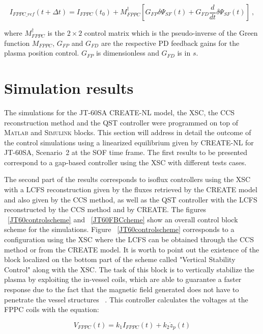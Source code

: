 \begin{equation}
I_{FPPC\_ref}(t+\Delta t)=I_{FPPC}(t_0)+ M^\dagger_{FPPC}\left[G_{FP}\delta \Psi_{SF}(t) + G_{FD}\frac{d}{dt}\delta\Psi_{SF}(t) \right] ~,
\end{equation}

where $ M^\dagger_{FPPC}$ is the $ 2 \times 2$ control matrix which is the pseudo-inverse of the Green function $M_{FPPC}$, $ G_{FP} $ and $ G_{FD} $
are the respective PD feedback gains for the plasma position control. $ G_{FP} $ is dimensionless and $ G_{FD} $ is in $s$.



\section{Simulation results}	

 The simulations for  the JT-60SA CREATE-NL model, the XSC, the CCS reconstruction method and the QST controller  were programmed on top of  \textsc{Matlab} and \textsc{Simulink} blocks. This  section will address in detail the outcome of the control simulations using a linearized equilibrium given by CREATE-NL for JT-60SA, Scenario~2 at the SOF time frame. The first results to be presented correspond to a  gap-based controller  using the XSC with different tests cases.
 \smallskip
 
 
 The second part of the results corresponds to isoflux controllers using the XSC  with a LCFS reconstruction given by the fluxes retrieved by the CREATE model and also given by the CCS method, as well as the QST controller with the LCFS reconstructed by the CCS method and by CREATE. The figures ~\ref{JT60controlscheme} and ~\ref{JT60FBCcheme} show an overall control block scheme for the simulations.   Figure ~\ref{JT60controlscheme} corresponds to a configuration using the XSC where the LCFS can be obtained through the CCS method or from the CREATE model. It is worth to point out the existence of the block localized on the bottom part of the scheme called "Vertical Stability Control" along with the XSC. The task of this block is to vertically stabilize the plasma by exploiting the in-vessel coils, which are able to guarantee a faster response due to the fact that the magnetic field generated does not have to penetrate the vessel structures  ~\cite{NCruz}. This controller calculates the voltages at the FPPC coils with the equation:
 
 \begin{equation}
 V_{FPPC}(t)=k_1I_{FPPC}(t)+ k_2\dot{z}_p(t)
 \label{FPPC_eqs}
 \end{equation}   
 
